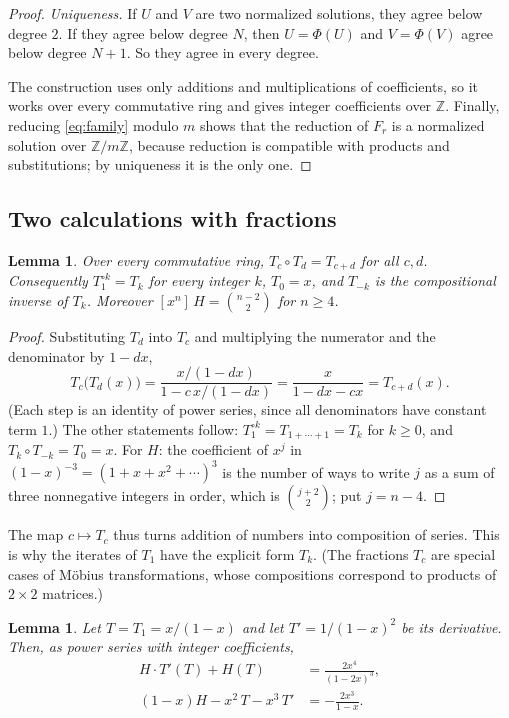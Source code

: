 \documentclass[11pt,a4paper]{article}
\newtheorem{lemma}[theorem]{Lemma}
\theoremstyle{definition}
\theoremstyle{remark}
\newcommand{\Z}{\mathbb{Z}}
\newcommand{\coeff}[2]{[x^{#1}]\,#2}
\begin{document}
\begin{proof}
\emph{Uniqueness.} If $U$ and $V$ are two normalized solutions, they agree below degree $2$. If they agree below
degree $N$, then $U=\Phi(U)$ and $V=\Phi(V)$ agree below degree $N+1$. So they agree in every degree.

The construction uses only additions and multiplications of coefficients, so it works over every commutative ring
and gives integer coefficients over $\Z$. Finally, reducing \eqref{eq:family} modulo $m$ shows that the reduction of
$F_r$ is a normalized solution over $\Z/m\Z$, because reduction is compatible with products and substitutions; by
uniqueness it is the only one.
\end{proof}

\subsection{Two calculations with fractions}

\begin{lemma}\label{lem:mobius}
Over every commutative ring, $T_c\circ T_d=T_{c+d}$ for all $c,d$. Consequently $T_1^{\circ k}=T_k$ for every integer
$k$, $T_0=x$, and $T_{-k}$ is the compositional inverse of $T_k$. Moreover $\coeff{n}{H}=\binom{n-2}{2}$ for $n\ge4$.
\end{lemma}

\begin{proof}
Substituting $T_d$ into $T_c$ and multiplying the numerator and the denominator by $1-dx$,
\[
T_c\bigl(T_d(x)\bigr)=\frac{x/(1-dx)}{1-c\,x/(1-dx)}=\frac{x}{1-dx-cx}=T_{c+d}(x).
\]
(Each step is an identity of power series, since all denominators have constant term $1$.) The other statements
follow: $T_1^{\circ k}=T_{1+\cdots+1}=T_k$ for $k\ge0$, and $T_k\circ T_{-k}=T_0=x$. For $H$: the coefficient of $x^j$
in $(1-x)^{-3}=(1+x+x^2+\cdots)^3$ is the number of ways to write $j$ as a sum of three nonnegative integers in order,
which is $\binom{j+2}{2}$; put $j=n-4$.
\end{proof}

The map $c\mapsto T_c$ thus turns addition of numbers into composition of series. This is why the iterates of $T_1$
have the explicit form $T_k$. (The fractions $T_c$ are special cases of M\"obius transformations, whose compositions correspond to
products of $2\times2$ matrices.)

\begin{lemma}\label{lem:ident}
Let $T=T_1=x/(1-x)$ and let $T'=1/(1-x)^2$ be its derivative. Then, as power series with integer coefficients,
\begin{align}
H\cdot T'(T)+H(T)&=\frac{2x^4}{(1-2x)^3},\label{eq:id1}\\
(1-x)H-x^2\,T-x^3\,T'&=-\frac{2x^3}{1-x}.\label{eq:id2}
\end{align}
\end{lemma}
\end{document}
